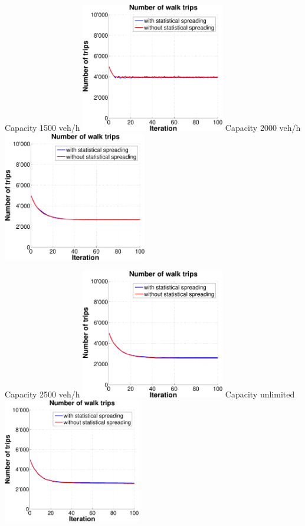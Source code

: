 {  \createsubfigure%
  {Capacity 1500 veh/h}%
  {\includegraphics[width=0.47\textwidth, angle=0, trim=0mm 0mm 0mm 9mm, clip=true]{extending/figures/MultiModalSimulation/simulations/num_walk_trips_no_scatter_1500}}%
  {\label{}}%
  {\hspace{3mm}}%
  \createsubfigure%
  {Capacity 2000 veh/h}%
  {\includegraphics[width=0.47\textwidth, angle=0, trim=0mm 0mm 0mm 9mm, clip=true]{extending/figures/MultiModalSimulation/simulations/num_walk_trips_no_scatter_2000}}%
  {\label{}}%
  {\vspace{7.5mm}}%

  \createsubfigure%
  {Capacity 2500 veh/h}%
  {\includegraphics[width=0.47\textwidth, angle=0, trim=0mm 0mm 0mm 9mm, clip=true]{extending/figures/MultiModalSimulation/simulations/num_walk_trips_no_scatter_2500}}%
  {\label{}}%
  {\hspace{3mm}}%
  \createsubfigure%
  {Capacity unlimited}%
  {\includegraphics[width=0.45\textwidth, angle=0, trim=0mm 0mm 0mm 9mm, clip=true]{extending/figures/MultiModalSimulation/simulations/num_walk_trips_no_scatter_unlimited}}%
  {\label{}}%
  {}%
}%
